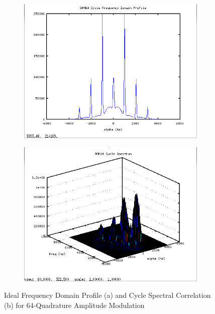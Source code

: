 \begin{figure}
\centering
\begin{subfigure}{.49\textwidth}
\centering
\includegraphics[width=\linewidth]{../img/Report_QAM64_Ia_Ideal.png}
  \caption{ }
\end{subfigure}
\begin{subfigure}{.49\textwidth}
  \centering
  \includegraphics[width=\linewidth]{../img/Report_QAM64_Sxa_Ideal.png}
  \caption{ }
\end{subfigure}
\caption{Ideal Frequency Domain Profile (a) and Cycle Spectral Correlation (b)
for 64-Quadrature Amplitude Modulation}
\label{fig:IdealQAM64Cyclo}
\end{figure}


